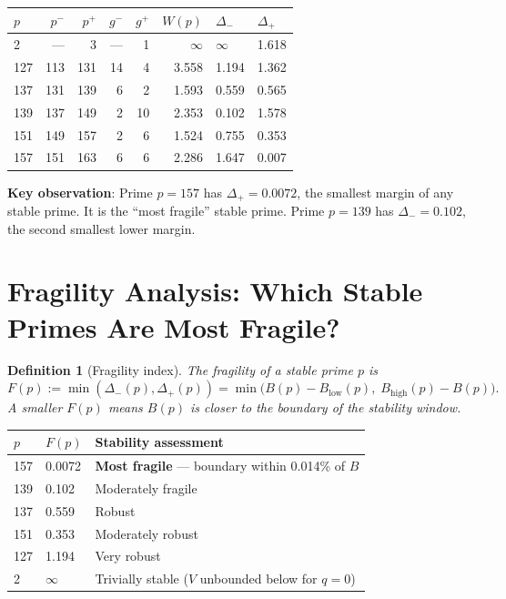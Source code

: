 \documentclass[11pt,a4paper]{article}
\newtheorem{definition}{Definition}
\begin{document}
\begin{center}
\begin{tabular}{lrrrrrll}
\hline
$p$ & $p^-$ & $p^+$ & $g^-$ & $g^+$ & $W(p)$ & $\Delta_-$ & $\Delta_+$ \\
\hline
2 & --- & 3 & --- & 1 & $\infty$ & $\infty$ & 1.618 \\
127 & 113 & 131 & 14 & 4 & 3.558 & 1.194 & 1.362 \\
137 & 131 & 139 & 6 & 2 & 1.593 & 0.559 & 0.565 \\
139 & 137 & 149 & 2 & 10 & 2.353 & 0.102 & 1.578 \\
151 & 149 & 157 & 2 & 6 & 1.524 & 0.755 & 0.353 \\
157 & 151 & 163 & 6 & 6 & 2.286 & 1.647 & 0.007 \\
\hline
\end{tabular}
\end{center}

\textbf{Key observation}: Prime $p = 157$ has $\Delta_+ = 0.0072$, the
smallest margin of any stable prime.  It is the ``most fragile'' stable prime.
Prime $p = 139$ has $\Delta_- = 0.102$, the second smallest lower margin.

\section{Fragility Analysis: Which Stable Primes Are Most Fragile?}

\begin{definition}[Fragility index]
  The fragility of a stable prime $p$ is
  \[
    F(p) := \min(\Delta_-(p), \Delta_+(p)) = \min\bigl(B(p) - B_\mathrm{low}(p),\;
    B_\mathrm{high}(p) - B(p)\bigr).
  \]
  A smaller $F(p)$ means $B(p)$ is closer to the boundary of the stability window.
\end{definition}

\begin{center}
\begin{tabular}{lll}
\hline
$p$ & $F(p)$ & Stability assessment \\
\hline
157 & 0.0072 & \textbf{Most fragile} — boundary within 0.014\% of $B$ \\
139 & 0.102 & Moderately fragile \\
137 & 0.559 & Robust \\
151 & 0.353 & Moderately robust \\
127 & 1.194 & Very robust \\
2 & $\infty$ & Trivially stable ($V$ unbounded below for $q = 0$) \\
\hline
\end{tabular}
\end{center}
\end{document}
